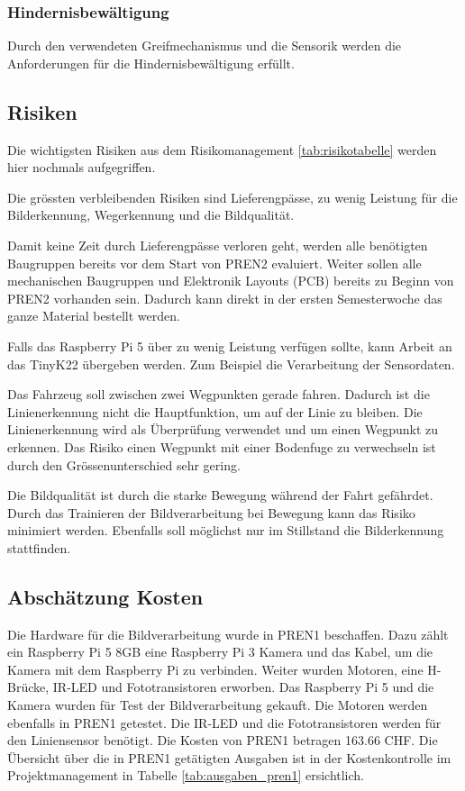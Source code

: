 \documentclass[../main.tex]{subfiles}
\begin{document}
\subsubsection{Hindernisbewältigung}
Durch den verwendeten Greifmechanismus und die Sensorik werden die Anforderungen für die Hindernisbewältigung erfüllt.

\newpage
\subsection{Risiken}
Die wichtigsten Risiken aus dem Risikomanagement \ref{tab:risikotabelle} werden hier nochmals aufgegriffen.

Die grössten verbleibenden Risiken sind Lieferengpässe, zu wenig Leistung für die Bilderkennung, Wegerkennung und die Bildqualität. 

Damit keine Zeit durch Lieferengpässe verloren geht, werden alle benötigten Baugruppen bereits vor dem Start von PREN2 evaluiert. Weiter sollen alle mechanischen Baugruppen und Elektronik Layouts (PCB) bereits zu Beginn von PREN2 vorhanden sein. Dadurch kann direkt in der ersten Semesterwoche das ganze Material bestellt werden.

Falls das Raspberry Pi 5 über zu wenig Leistung verfügen sollte, kann Arbeit an das TinyK22 übergeben werden. Zum Beispiel die Verarbeitung der Sensordaten. 

Das Fahrzeug soll zwischen zwei Wegpunkten gerade fahren. Dadurch ist die Linienerkennung nicht die Hauptfunktion, um auf der Linie zu bleiben. Die Linienerkennung wird als Überprüfung verwendet und um einen Wegpunkt zu erkennen. Das Risiko einen Wegpunkt mit einer Bodenfuge zu verwechseln ist durch den Grössenunterschied sehr gering. 

Die Bildqualität ist durch die starke Bewegung während der Fahrt gefährdet. Durch das Trainieren der Bildverarbeitung bei Bewegung kann das Risiko minimiert werden. Ebenfalls soll möglichst nur im Stillstand die Bilderkennung stattfinden. 

\subsection{Abschätzung Kosten}
Die Hardware für die Bildverarbeitung wurde in PREN1 beschaffen. Dazu zählt ein Raspberry Pi 5 8GB eine Raspberry Pi 3 Kamera und das Kabel, um die Kamera mit dem Raspberry Pi zu verbinden. Weiter wurden Motoren, eine H-Brücke, IR-LED und Fototransistoren erworben. Das Raspberry Pi 5 und die Kamera wurden für Test der Bildverarbeitung gekauft. Die Motoren werden ebenfalls in PREN1 getestet. Die IR-LED und die Fototransistoren werden für den Liniensensor benötigt. Die Kosten von PREN1 betragen 163.66 CHF. Die Übersicht über die in PREN1 getätigten Ausgaben ist in der Kostenkontrolle im Projektmanagement in Tabelle \ref{tab:ausgaben_pren1} ersichtlich. 
\end{document}
